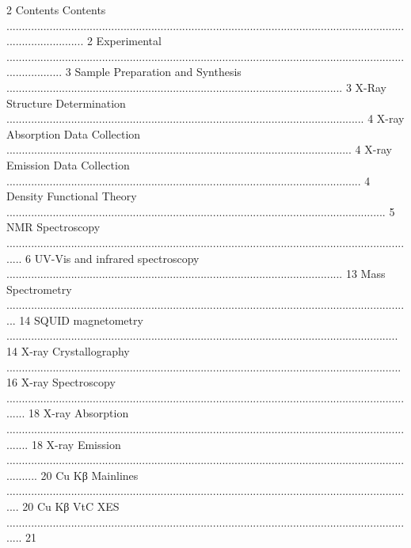 2 
Contents 
Contents .......................................................................................................................................................... 2 
Experimental ................................................................................................................................................... 3 
Sample Preparation and Synthesis ............................................................................................................. 3 
X-Ray Structure Determination .................................................................................................................... 4 
X-ray Absorption Data Collection ................................................................................................................ 4 
X-ray Emission Data Collection ................................................................................................................... 4 
Density Functional Theory ........................................................................................................................... 5 
NMR Spectroscopy ...................................................................................................................................... 6 
UV-Vis and infrared spectroscopy ............................................................................................................. 13 
Mass Spectrometry .................................................................................................................................... 14 
SQUID magnetometry ............................................................................................................................... 14 
X-ray Crystallography ................................................................................................................................ 16 
X-ray Spectroscopy ....................................................................................................................................... 18 
X-ray Absorption ........................................................................................................................................ 18 
X-ray Emission ........................................................................................................................................... 20 
Cu Kβ Mainlines ..................................................................................................................................... 20 
Cu Kβ VtC XES ...................................................................................................................................... 21 

